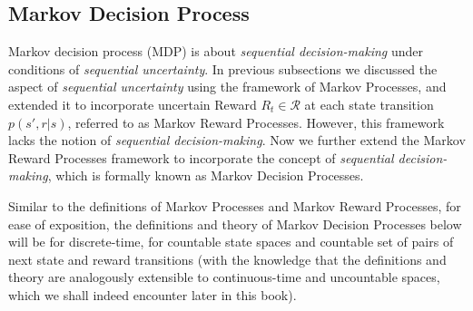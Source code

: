 \documentclass[../xlapes02]{subfiles}
\begin{document}
    \subsection{Markov Decision Process}\label{subsec:markov-decision-process}
    Markov decision process (MDP) is about \emph{sequential decision-making} under conditions of \emph{sequential uncertainty}. In previous subsections we discussed the aspect of \emph{sequential uncertainty} using the framework of Markov Processes, and extended it to incorporate uncertain Reward $R_t\in\mathcal{R}$ at each state transition $p(s',r|s)$, referred to as Markov Reward Processes. However, this framework lacks the notion of \emph{sequential decision-making}. Now we further extend the Markov Reward Processes framework to incorporate the concept of \emph{sequential decision-making}, which is formally known as Markov Decision Processes.


    Similar to the definitions of Markov Processes and Markov Reward Processes, for ease of exposition, the definitions and theory of Markov Decision Processes below will be for discrete-time, for countable state spaces and countable set of pairs of next state and reward transitions (with the knowledge that the definitions and theory are analogously extensible to continuous-time and uncountable spaces, which we shall indeed encounter later in this book).
\end{document}
